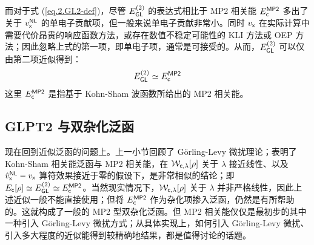 而对于式 (\ref{eq.2.GL2-def})，尽管 $E_{\textsf{GL}}^{(2)}$ 的表达式相比于 MP2 相关能 $E_{\textsf{c}}^{\textsf{MP2}}$ 多出了关于 $v_{\textsf{x}}^{\textsf{NL}}$ 的单电子贡献项，但一般来说单电子贡献非常小\cite{DellaSala-Goerling.JCP.2001}。同时 $v_{\textsf{x}}$ 在实际计算中需要代价昂贵的响应函数方法\cite{Goerling-Goerling.PRL.1999}，或存在数值不稳定可能性的 KLI 方法\cite{Krieger-Iafrate.PRA.1992, DellaSala-Goerling.JCP.2001}或 OEP 方法\cite{Mori-Sanchez-Yang.JCP.2005}；因此忽略上式的第一项，即单电子项，通常是可接受的。从而，$E_{\textsf{GL}}^{(2)}$ 可以仅由第二项近似得到：
\begin{equation}
  E_{\textsf{GL}}^{(2)} \simeq E_{\textsf{c}}^{\textsf{MP2}}
\end{equation}
这里 $E_{\textsf{c}}^{\textsf{MP2}}$ 是指基于 Kohn-Sham 波函数所给出的 MP2 相关能。

\subsection{GLPT2 与双杂化泛函}
\label{sec.2.glpt2-dh}

现在回到近似泛函的问题上。上一小节回顾了 G{\"o}rling-Levy 微扰理论；表明了 Kohn-Sham 相关能泛函与 MP2 相关能，在 $\mathcal{W}_{\textsf{c}, \lambda} [\rho]$ 关于 $\lambda$ 接近线性、以及 $\hat v_{\textsf{x}}^{\textsf{NL}} - v_{\textsf{x}}$ 算符效果接近于零的假设下，是非常相似的结论；即 $E_{\textsf{c}} [\rho] \simeq E_{\textsf{GL}}^{(2)} \simeq E_{\textsf{c}}^{\textsf{MP2}}$。当然现实情况下，$\mathcal{W}_{\textsf{c}, \lambda} [\rho]$ 关于 $\lambda$ 并非严格线性，因此上述近似一般不能直接使用；但将 $E_{\textsf{c}}^{\textsf{MP2}}$ 作为杂化项掺入泛函，仍然是有所帮助的。这就构成了一般的 MP2 型双杂化泛函。但 MP2 相关能仅仅是最初步的其中一种引入 G\"orling-Levy 微扰方式；从具体实现上，如何引入 G\"orling-Levy 微扰、引入多大程度的近似能得到较精确地结果，都是值得讨论的话题。


